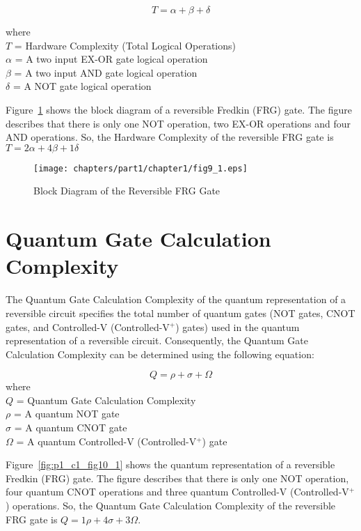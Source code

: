 \begin{equation}
T=\alpha+\beta+\delta
\end{equation}

\noindent where\\
$T$ = Hardware Complexity  (Total  Logical  Operations)\\ 
$\alpha$ = A two input EX-OR gate logical operation \\
$\beta$ = A two input AND gate logical operation \\
$\delta$ = A  NOT gate logical  operation  

\begin{example}\textnormal{
	Figure~\ref{fig:p1_c1_fig9_1} shows the block diagram of  a reversible Fredkin (FRG) gate. The figure describes that there is only one NOT operation, two EX-OR operations and four AND operations. So, the Hardware Complexity of the reversible FRG gate is $T= 2\alpha+4\beta+1\delta$}
\end{example}
\begin{figure}[H]
	\centering
	\texttt{[image: chapters/part1/chapter1/fig9\_1.eps]}
	\caption{Block Diagram of the Reversible FRG Gate}
	\label{fig:p1_c1_fig9_1}
\end{figure}

\section{Quantum Gate Calculation Complexity}
The Quantum Gate Calculation Complexity of the quantum  representation  of a reversible circuit specifies the total number of quantum gates (NOT gates, CNOT gates, and Controlled-V (Controlled-V$^+$) gates) used in the quantum representation of a reversible circuit. Consequently, the Quantum Gate Calculation Complexity can be determined using the following equation:


\begin{equation}
Q=\rho+\sigma+\Omega
\end{equation}
\noindent where\\
$Q$ = Quantum Gate Calculation Complexity\\
$\rho$ = A quantum NOT gate \\
$\sigma$ = A quantum CNOT gate   \\
$\Omega$ = A quantum Controlled-V (Controlled-V$^+$) gate


\begin{example}\textnormal{
Figure~\ref{fig:p1_c1_fig10_1} shows the quantum representation of  a  reversible Fredkin (FRG) gate. The figure describes that there is only one NOT operation, four  quantum CNOT operations and three  quantum Controlled-V (Controlled-V$^+$) operations. So, the  Quantum Gate Calculation Complexity of the reversible FRG gate is $Q =1\rho +4\sigma + 3\Omega$.}
\end{example}


